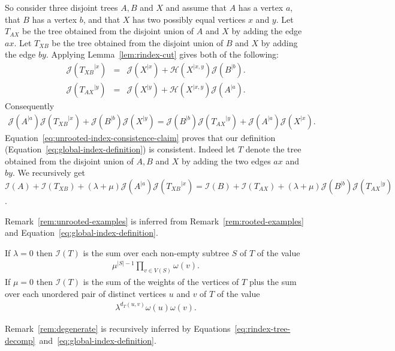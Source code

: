\documentclass[11 pt]{modarticle}
\newcommand{\wmap}{\omega}
\newcommand{\size}[1]{|#1|}
\newcommand{\vsetof}[1]{V(#1)}
\newcommand{\distance}[3]{d_{#3}(#1,#2)}
\newcommand{\rtree}[2]{{#1}^{\lvert #2}}
\newcommand{\indexsymbol}{\mathcal{I}}
\newcommand{\tindex}[1]{\indexsymbol(#1)}
\newcommand{\rindexsymbol}{\mathcal{J}}
\newcommand{\rindex}[2]{\rindexsymbol(\rtree{#2}{#1})}
\newcommand{\aindexsymbol}{\mathcal{H}}
\newcommand{\aindex}[3]{\aindexsymbol(\rtree{#3}{#1, #2})}
\begin{document}
So consider three disjoint trees $A, B$ and $X$ and assume that $A$ has a vertex $a$, that $B$ has a vertex $b$, and that $X$ has two possibly equal vertices $x$ and $y$. Let $T_{AX}$ be the tree obtained from the disjoint union of $A$ and $X$ by adding the edge $ax$. Let $T_{XB}$ be the tree obtained from the disjoint union of $B$ and $X$ by adding the edge $by$. Applying Lemma~\ref{lem:rindex-cut} gives both of the following:
\begin{eqnarray*}
	\rindex{x}{T_{XB}} & = & \rindex{x}{X} + \aindex{x}{y}{X} \rindex{b}{B}. \\
	\rindex{y}{T_{AX}} & = & \rindex{y}{X} + \aindex{x}{y}{X} \rindex{a}{A}.
\end{eqnarray*} 
Consequently
\begin{eqnarray}
	\rindex{a}{A} \rindex{x}{T_{XB}} + \rindex{b}{B} \rindex{y}{X} = \rindex{b}{B} \rindex{y}{T_{AX}} + \rindex{a}{A} \rindex{x}{X}. \label{eq:unrooted-index-consistence-claim}
\end{eqnarray}
Equation~\eqref{eq:unrooted-index-consistence-claim} proves that our definition (Equation~\eqref{eq:global-index-definition}) is consistent. Indeed let $T$ denote the tree obtained from the disjoint union of $A,B$ and $X$ by adding the two edges $ax$ and $by$. We recursively get $\tindex{A} + \tindex{T_{XB}} + (\lambda + \mu) \rindex{a}{A} \rindex{x}{T_{XB}} = \tindex{B} + \tindex{T_{AX}} + (\lambda + \mu) \rindex{b}{B} \rindex{y}{T_{AX}}$.

Remark~\ref{rem:unrooted-examples} is inferred from Remark~\ref{rem:rooted-examples} and Equation~\eqref{eq:global-index-definition}.

\begin{rem}\label{rem:unrooted-examples}
If $\lambda = 0$ then $\tindex{T}$ is the sum over each non-empty subtree $S$ of $T$ of the value
\begin{eqnarray*}
	\mu^{\size{S}-1} \underset{v \in \vsetof{S}}{\prod} \wmap(v).
\end{eqnarray*}
If $\mu = 0$ then $\tindex{T}$ is the sum of the weights of the vertices of $T$ plus the sum over each unordered pair of distinct vertices $u$ and $v$ of $T$ of the value
\begin{eqnarray*}
	\lambda^{\distance{u}{v}{T}} \wmap(u) \wmap(v).
\end{eqnarray*}
\end{rem}

Remark~\ref{rem:degenerate} is recursively inferred by Equations~\eqref{eq:rindex-tree-decomp}~and~\eqref{eq:global-index-definition}.
\end{document}
